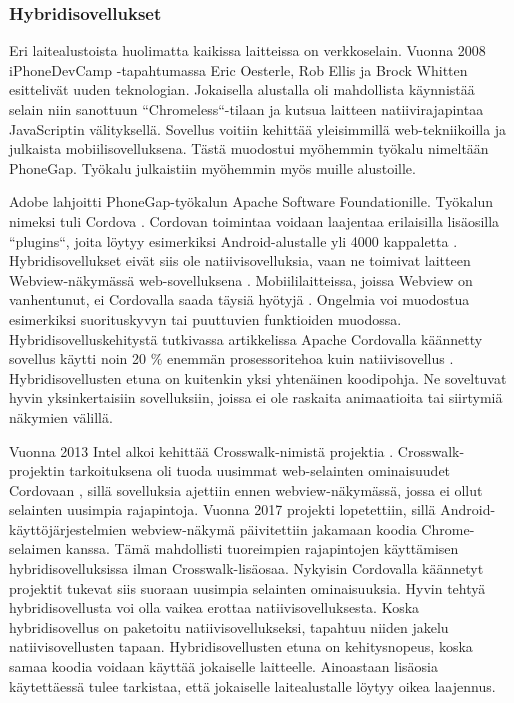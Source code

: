 \documentclass{tktltiki}
\begin{document}
\subsubsection{Hybridisovellukset}

Eri laitealustoista huolimatta kaikissa laitteissa on verkkoselain. Vuonna 2008 iPhoneDevCamp -tapahtumassa Eric Oesterle, Rob Ellis ja Brock Whitten \cite{charland2011mobile} esittelivät uuden teknologian. Jokaisella alustalla oli mahdollista käynnistää selain niin sanottuun “Chromeless“-tilaan ja kutsua laitteen natiivirajapintaa JavaScriptin välityksellä. Sovellus voitiin kehittää yleisimmillä web-tekniikoilla ja julkaista mobiilisovelluksena. Tästä muodostui myöhemmin työkalu nimeltään PhoneGap. Työkalu julkaistiin myöhemmin myös muille alustoille. 

Adobe lahjoitti PhoneGap-työkalun Apache Software Foundationille. Työkalun nimeksi tuli Cordova \cite{Tung}. Cordovan toimintaa voidaan laajentaa erilaisilla lisäosilla “plugins“, joita löytyy esimerkiksi Android-alustalle yli 4000 kappaletta \cite{Cordova}. Hybridisovellukset eivät siis ole natiivisovelluksia, vaan ne toimivat laitteen Webview-näkymässä web-sovelluksena \cite{bosnic2016development}. Mobiililaitteissa, joissa Webview on vanhentunut, ei Cordovalla saada täysiä hyötyjä \cite{bosnic2016development}. Ongelmia voi muodostua esimerkiksi suorituskyvyn tai puuttuvien funktioiden muodossa. Hybridisovelluskehitystä tutkivassa artikkelissa Apache Cordovalla käännetty sovellus käytti noin 20 \% enemmän prosessoritehoa kuin natiivisovellus \cite{bosnic2016development}. Hybridisovellusten etuna on kuitenkin yksi yhtenäinen koodipohja. Ne soveltuvat hyvin yksinkertaisiin sovelluksiin, joissa ei ole raskaita animaatioita tai siirtymiä näkymien välillä. 

Vuonna 2013 Intel alkoi kehittää Crosswalk-nimistä projektia \cite{Crosswalk}. Crosswalk-projektin tarkoituksena oli tuoda uusimmat web-selainten ominaisuudet Cordovaan \cite{bosnic2016development}, sillä sovelluksia ajettiin ennen webview-näkymässä, jossa ei ollut selainten uusimpia rajapintoja. Vuonna 2017 projekti lopetettiin, sillä Android-käyttöjärjestelmien webview-näkymä päivitettiin jakamaan koodia Chrome-selaimen kanssa. Tämä mahdollisti tuoreimpien rajapintojen käyttämisen hybridisovelluksissa ilman Crosswalk-lisäosaa. Nykyisin Cordovalla käännetyt projektit tukevat siis suoraan uusimpia selainten ominaisuuksia. Hyvin tehtyä hybridisovellusta voi olla vaikea erottaa natiivisovelluksesta. Koska hybridisovellus on paketoitu natiivisovellukseksi, tapahtuu niiden jakelu natiivisovellusten tapaan. Hybridisovellusten etuna on kehitysnopeus, koska samaa koodia voidaan käyttää jokaiselle laitteelle. Ainoastaan lisäosia käytettäessä tulee tarkistaa, että jokaiselle laitealustalle löytyy oikea laajennus. 
\end{document}
